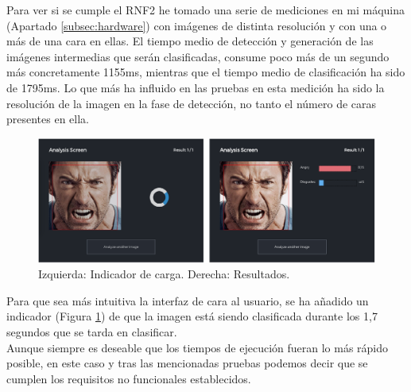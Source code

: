 \documentclass[a4paper,11pt]{book}
\begin{document}
Para ver si se cumple el RNF2 he tomado una serie de mediciones en mi máquina (Apartado \ref{subsec:hardware}) con imágenes de distinta resolución y con una o más de una cara en ellas. El tiempo medio de detección y generación de las imágenes intermedias que serán clasificadas, consume poco más de un segundo más concretamente 1155ms, mientras que el tiempo medio de clasificación ha sido de 1795ms. Lo que más ha influido en las pruebas en esta medición ha sido la resolución de la imagen en la fase de detección, no tanto el número de caras presentes en ella.\\
\begin{figure}[h]
\centering
\includegraphics[width=0.9\linewidth]{imagenes/loading}
\caption[Indicador de carga]{Izquierda: Indicador de carga. Derecha: Resultados.}
\label{fig:loading}
\end{figure}

Para que sea más intuitiva la interfaz de cara al usuario, se ha añadido un indicador (Figura \ref{fig:loading}) de que la imagen está siendo clasificada durante los 1,7 segundos que se tarda en clasificar.\\
Aunque siempre es deseable que los tiempos de ejecución fueran lo más rápido posible, en este caso y tras las mencionadas pruebas podemos decir que se cumplen los requisitos no funcionales establecidos.\\





\end{document}
